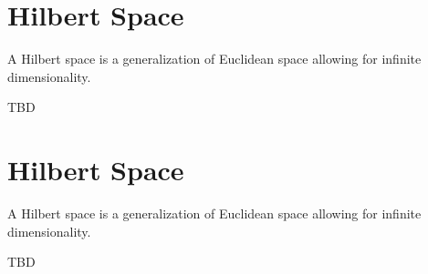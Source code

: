 \section{Hilbert Space}

A Hilbert space is a generalization of Euclidean space
allowing for infinite dimensionality.

\begin{definition}
TBD
\end{definition}



\section{Hilbert Space}

A Hilbert space is a generalization of Euclidean space
allowing for infinite dimensionality.

\begin{definition}
TBD
\end{definition}



